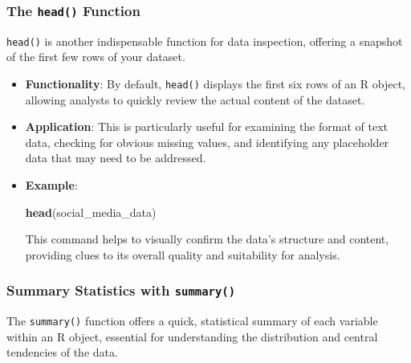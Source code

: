 \documentclass[
]{book}
\newenvironment{Shaded}{\begin{snugshade}}{\end{snugshade}}
\newcommand{\FunctionTok}[1]{\textcolor[rgb]{0.13,0.29,0.53}{\textbf{#1}}}
\newcommand{\NormalTok}[1]{#1}
\begin{document}
\hypertarget{the-head-function}{%
\subsubsection{\texorpdfstring{The \texttt{head()} Function}{The head() Function}}\label{the-head-function}}

\texttt{head()} is another indispensable function for data inspection, offering a snapshot of the first few rows of your dataset.

\begin{itemize}
\item
  \textbf{Functionality}: By default, \texttt{head()} displays the first six rows of an R object, allowing analysts to quickly review the actual content of the dataset.
\item
  \textbf{Application}: This is particularly useful for examining the format of text data, checking for obvious missing values, and identifying any placeholder data that may need to be addressed.
\item
  \textbf{Example}:

\begin{Shaded}
\begin{Highlighting}[]
\FunctionTok{head}\NormalTok{(social\_media\_data)}
\end{Highlighting}
\end{Shaded}

  This command helps to visually confirm the data's structure and content, providing clues to its overall quality and suitability for analysis.
\end{itemize}

\hypertarget{summary-statistics-with-summary}{%
\subsubsection{\texorpdfstring{Summary Statistics with \texttt{summary()}}{Summary Statistics with summary()}}\label{summary-statistics-with-summary}}

The \texttt{summary()} function offers a quick, statistical summary of each variable within an R object, essential for understanding the distribution and central tendencies of the data.
\end{document}
